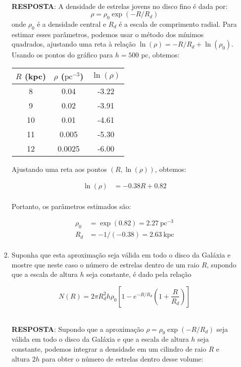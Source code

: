 \documentclass[a4paper,12pt]{article}
\begin{document}
\begin{enumerate}
\begin{enumerate}
\noindent\hrulefill\\\textbf{RESPOSTA}: A densidade de estrelas jovens no disco fino é dada por: $$\rho=\rho_0 \exp(-R/R_d)$$ onde $\rho_0$ é a densidade central e $R_d$ é a escala de comprimento radial. Para estimar esses parâmetros, podemos usar o método dos mínimos quadrados, ajustando uma reta à relação $\ln(\rho)=-R/R_d+\ln(\rho_0)$. Usando os pontos do gráfico para $h=500$ pc, obtemos:

\begin{tabular}{c||c||c}
$R$ (kpc) & $\rho$ ($\mathrm{pc}^{-3}$) & $\ln(\rho)$ \\
\hline
8 & 0.04 & -3.22 \\
9 & 0.02 & -3.91 \\
10 & 0.01 & -4.61 \\
11 & 0.005 & -5.30 \\
12 & 0.0025 & -6.00 \\
\end{tabular}

Ajustando uma reta aos pontos $(R,\ln(\rho))$, obtemos:

\begin{align*}
\ln(\rho)&=-0.38 R + 0.82\\
\end{align*}

Portanto, os parâmetros estimados são:

\begin{align*}
\rho_0&=\exp(0.82)=2.27 \ \mathrm{pc}^{-3}\\
R_d&=-1/(-0.38)=2.63 \ \mathrm{kpc}\\
\end{align*}

\noindent\hrulefill

\item Suponha que esta aproximação seja válida em todo o disco da Galáxia e mostre que neste caso o número de estrelas dentro de um raio $R$, supondo que a escala de altura $h$ seja constante, é dado pela relação

$$N(R) = 2\pi R_d^2 h \rho_0 \left[1-e^{-R/R_d}\left(1+\frac{R}{R_d}\right)\right]$$

\noindent\hrulefill\\\textbf{RESPOSTA}: Supondo que a aproximação $\rho=\rho_0 \exp(-R/R_d)$ seja válida em todo o disco da Galáxia e que a escala de altura $h$ seja constante, podemos integrar a densidade em um cilindro de raio $R$ e altura $2h$ para obter o número de estrelas dentro desse volume:


\end{enumerate}
\end{enumerate}
\end{document}
